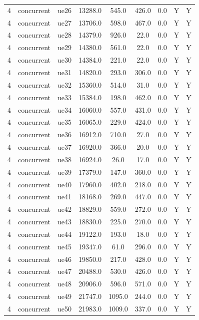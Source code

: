 \begin{table}[ht]
\begin{tabular}{|c|c|c|c|c|c|c|c|c|}
4 & concurrent & ue26 & 13288.0 & 545.0 & 426.0 & 0.0 & Y & Y \\
4 & concurrent & ue27 & 13706.0 & 598.0 & 467.0 & 0.0 & Y & Y \\
4 & concurrent & ue28 & 14379.0 & 926.0 & 22.0 & 0.0 & Y & Y \\
4 & concurrent & ue29 & 14380.0 & 561.0 & 22.0 & 0.0 & Y & Y \\
4 & concurrent & ue30 & 14384.0 & 221.0 & 22.0 & 0.0 & Y & Y \\
4 & concurrent & ue31 & 14820.0 & 293.0 & 306.0 & 0.0 & Y & Y \\
4 & concurrent & ue32 & 15360.0 & 514.0 & 31.0 & 0.0 & Y & Y \\
4 & concurrent & ue33 & 15384.0 & 198.0 & 462.0 & 0.0 & Y & Y \\
4 & concurrent & ue34 & 16060.0 & 557.0 & 431.0 & 0.0 & Y & Y \\
4 & concurrent & ue35 & 16065.0 & 229.0 & 424.0 & 0.0 & Y & Y \\
4 & concurrent & ue36 & 16912.0 & 710.0 & 27.0 & 0.0 & Y & Y \\
4 & concurrent & ue37 & 16920.0 & 366.0 & 20.0 & 0.0 & Y & Y \\
4 & concurrent & ue38 & 16924.0 & 26.0 & 17.0 & 0.0 & Y & Y \\
4 & concurrent & ue39 & 17379.0 & 147.0 & 360.0 & 0.0 & Y & Y \\
4 & concurrent & ue40 & 17960.0 & 402.0 & 218.0 & 0.0 & Y & Y \\
4 & concurrent & ue41 & 18168.0 & 269.0 & 447.0 & 0.0 & Y & Y \\
4 & concurrent & ue42 & 18829.0 & 559.0 & 272.0 & 0.0 & Y & Y \\
4 & concurrent & ue43 & 18830.0 & 225.0 & 270.0 & 0.0 & Y & Y \\
4 & concurrent & ue44 & 19122.0 & 193.0 & 18.0 & 0.0 & Y & Y \\
4 & concurrent & ue45 & 19347.0 & 61.0 & 296.0 & 0.0 & Y & Y \\
4 & concurrent & ue46 & 19850.0 & 217.0 & 428.0 & 0.0 & Y & Y \\
4 & concurrent & ue47 & 20488.0 & 530.0 & 426.0 & 0.0 & Y & Y \\
4 & concurrent & ue48 & 20906.0 & 596.0 & 571.0 & 0.0 & Y & Y \\
4 & concurrent & ue49 & 21747.0 & 1095.0 & 244.0 & 0.0 & Y & Y \\
4 & concurrent & ue50 & 21983.0 & 1009.0 & 337.0 & 0.0 & Y & Y \\

\end{tabular}
\end{table}
